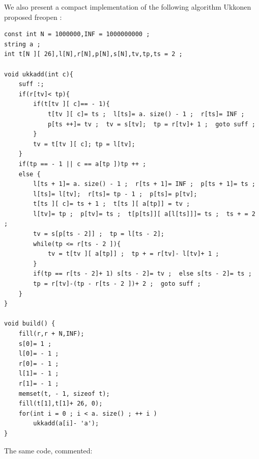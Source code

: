 We also present a compact implementation of the following algorithm Ukkonen proposed freopen :

\begin{verbatim}
const int N = 1000000,INF = 1000000000 ;
string a ;
int t[N ][ 26],l[N],r[N],p[N],s[N],tv,tp,ts = 2 ;
 
void ukkadd(int c){
    suff :;
    if(r[tv]< tp){
        if(t[tv ][ c]== - 1){
            t[tv ][ c]= ts ;  l[ts]= a. size() - 1 ;  r[ts]= INF ;
            p[ts ++]= tv ;  tv = s[tv];  tp = r[tv]+ 1 ;  goto suff ;
        }
        tv = t[tv ][ c]; tp = l[tv];
    }
    if(tp == - 1 || c == a[tp ])tp ++ ;
    else {
        l[ts + 1]= a. size() - 1 ;  r[ts + 1]= INF ;  p[ts + 1]= ts ;
        l[ts]= l[tv];  r[ts]= tp - 1 ;  p[ts]= p[tv];
        t[ts ][ c]= ts + 1 ;  t[ts ][ a[tp]] = tv ;
        l[tv]= tp ;  p[tv]= ts ;  t[p[ts]][ a[l[ts]]]= ts ;  ts + = 2 ;
        tv = s[p[ts - 2]] ;  tp = l[ts - 2];
        while(tp <= r[ts - 2 ]){
		    tv = t[tv ][ a[tp]] ;  tp + = r[tv]- l[tv]+ 1 ;
		}
        if(tp == r[ts - 2]+ 1) s[ts - 2]= tv ;  else s[ts - 2]= ts ; 
        tp = r[tv]-(tp - r[ts - 2 ])+ 2 ;  goto suff ;
    }
}
 
void build() {
    fill(r,r + N,INF);
    s[0]= 1 ;
    l[0]= - 1 ;
    r[0]= - 1 ;
    l[1]= - 1 ;
    r[1]= - 1 ;
    memset(t, - 1, sizeof t);
    fill(t[1],t[1]+ 26, 0);
    for(int i = 0 ; i < a. size() ; ++ i )
        ukkadd(a[i]- 'a');
} 
\end{verbatim}
The same code, commented:

